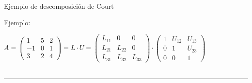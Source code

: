 \documentclass [8pt] {beamer}
\begin{document}
        \begin{frame}{Ejemplo de descomposición de Court}
            \begin{exampleblock}{Ejemplo:}
                {$A = \left( \begin{array}{ccc}
                1 & 5 & 2\\ 
                - 1 & 0 & 1\\   
                3 & 2 & 4
                \end{array} \right) = L \cdot U = \left( \begin{array}{lll}
                L_{11} & 0 & 0\\
                L_{21} & L_{22} & 0\\
                L_{31} & L_{32} & L_{33}
                \end{array} \right) \cdot \left( \begin{array}{lll}
                1 & U_{12} & U_{13}\\   
                0 & 1 & U_{23}\\
                0 & 0 & 1
                \end{array} \right)$ \\ \ \\ \rule{121mm}{0.1mm} \\ \ \\}
\end{exampleblock}
\end{frame}
\end{document}
